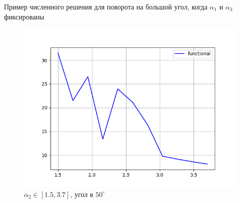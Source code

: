 \documentclass[10pt,utf8,presentation,notheorems,xcolor=dvipsnames,compress]{beamer}
\begin{document}


\begin{frame}{Пример численного решения для поворота на большой угол, когда $\alpha_1$ и $\alpha_3$ фиксированы}
\begin{figure}[H]
\center\includegraphics[scale=0.5]{fig/functional_alpha2_1_5-3_7_50.png}
\caption{$\alpha_2 \in [1.5, 3.7]$, угол в $50^{\circ}$}
\end{figure}
\end{frame}
\end{document}
